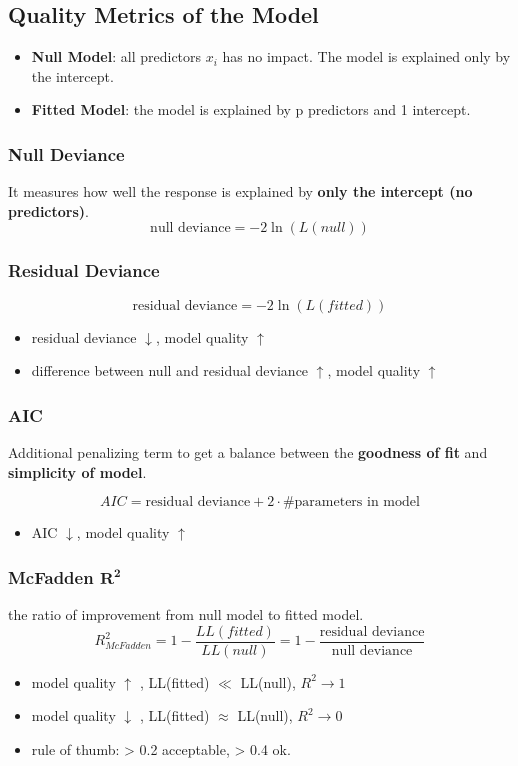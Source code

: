 \subsection{Quality Metrics of the Model}
\begin{itemize}
	\item \textbf{Null Model}: all predictors $x_i$ has no impact. The model is explained only by the intercept.
	\item \textbf{Fitted Model}: the model is explained by p predictors and 1 intercept.
\end{itemize}

\subsubsection{Null Deviance}
It measures how well the response is explained by \textbf{only the intercept (no predictors)}.
$$\text{null deviance} = -2 \ln(L(null))$$

\subsubsection{Residual Deviance}
$$\text{residual deviance} = -2 \ln(L(fitted))$$
\begin{itemize}
	\item residual deviance $\downarrow$, model quality $\uparrow$
	\item difference between null and residual deviance $\uparrow$, model quality $\uparrow$
\end{itemize}

\subsubsection{AIC}
Additional penalizing term to get a balance between the \textbf{goodness of fit} and \textbf{simplicity of model}.

$$AIC = \text{residual deviance} + 2 \cdot \#\text{parameters in model}$$

\begin{itemize}
	\item AIC $\downarrow$, model quality $\uparrow$
\end{itemize}

\subsubsection{McFadden $\mathbf{R^2}$} the ratio of improvement from null model to fitted model.
$$R_{McFadden}^2 = 1 - \frac{LL(fitted)}{LL(null)} = 1 - \frac{\text{residual deviance}}{\text{null deviance}}$$
\begin{itemize}
	\item model quality $\uparrow$ , LL(fitted) $\ll$ LL(null), $R^2 \rightarrow 1$
	\item model quality $\downarrow$ , LL(fitted) $\approx$ LL(null), $R^2 \rightarrow 0$
	\item rule of thumb: > 0.2 acceptable, > 0.4 ok.
\end{itemize}

